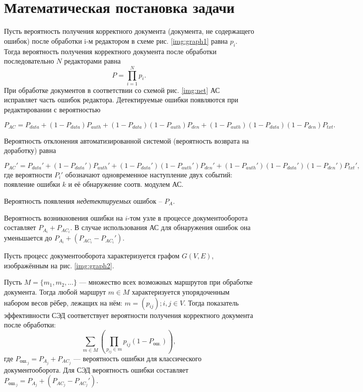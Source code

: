 \section{Математическая постановка задачи} \label{math}

Пусть вероятность получения корректного документа (документа, не содержащего ошибок) после обработки i-м редактором в схеме рис. \ref{img:graph1} равна $p_i$. Тогда вероятность получения корректного документа после обработки последовательно $N$ редакторами равна
$$
P=\prod_{i=1}^N p_i.
$$
При обработке документов в соответствии со схемой рис. \ref{img:net} АС исправляет часть ошибок редактора. Детектируемые ошибки появляются при редактировании с вероятностью

\begin{equation}
  \label{eq:equation3}
P_{AC}=P_{data}+(1-P_{data})P_{auth}+(1-P_{data})(1-P_{auth})P_{den}+(1-P_{auth})(1-P_{data})(1-P_{den})P_{txt}.
\end{equation}

Вероятность отклонения автоматизированной системой (вероятность возврата на доработку) равна

\begin{equation}
  \label{eq:equation4}
P_{AC}'=P_{data}'+(1-P_{data}')P_{auth}'+(1-P_{data}')(1-P_{auth}')P_{den}'+(1-P_{auth}')(1-P_{data}')(1-P_{den}')P_{txt}',
\end{equation}
где вероятности $P_i'$ обозначают одновременное наступление двух событий: появление ошибки $k$ и её обнаружение соотв. модулем АС.

\vspace{\baselineskip}
Вероятность появления \textit{недетектируемых} ошибок -- $P_A$.

\vspace{\baselineskip}
Вероятность возникновения ошибки на $i$-том узле в процессе документооборота составляет $P_{A_i}+P_{{AC}_i}$. В случае использования АС для обнаружения ошибок она уменьшается до $P_{A_i}+(P_{{AC}_i}-P_{{AC}_i}')$.

\vspace{\baselineskip}
Пусть процесс документооборота характеризуется графом $G(V,E)$, изображённым на рис. \ref{img:graph2}.

\vspace{\baselineskip}
Пусть $M = \{m_1, m_2, ... \}$ — множество всех возможных маршрутов при обработке документа. Тогда любой маршрут $m \in M$ характеризуется упорядоченным набором весов рёбер, лежащих на нём: $m=(p_{ij}); i,j \in V$. Тогда показатель эффективности СЭД соответствует вероятности получения корректного документа после обработки:
$$
\sum_{m \in M} (\prod_{p_{ij} \in m} p_{ij}(1-P_{\textrm{ош.}})),
$$
где $P_{{\textrm{ош.}}_j}=P_{A_j}+P_{{AC}_j}$ --- вероятность ошибки для классического документооборота. Для СЭД вероятность ошибки составляет $P_{{\textrm{ош.}}_j}=P_{A_j}+(P_{{AC}_j}-P_{{AC}_j}')$.

